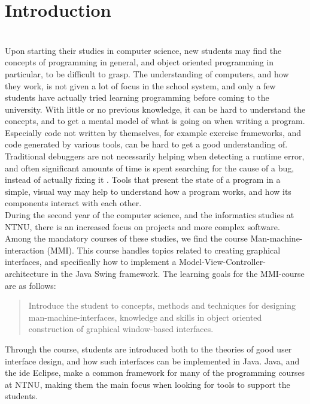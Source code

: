 \section{Introduction}\label{introduction}
~\\
Upon starting their studies in computer science, new students may find the concepts of programming in general, and object oriented programming in particular, to be difficult to grasp.
The understanding of computers, and how they work, is not given a lot of focus in the school system, and only a few students have actually tried learning programming before coming to the university.
With little or no previous knowledge, it can be hard to understand the concepts, and to get a mental model of what is going on when writing a program.
Especially code not written by themselves, for example exercise frameworks, and code generated by various tools, can be hard to get a good understanding of.
Traditional debuggers are not necessarily helping when detecting a runtime error, and often significant amounts of time is spent searching for the cause of a bug, instead of actually fixing it \cite{ko2006}.
Tools that present the state of a program in a simple, visual way may help to understand how a program works, and how its components interact with each other.
~\\

During the second year of the computer science, and the informatics studies at NTNU, there is an increased focus on projects and more complex software.
Among the mandatory courses of these studies, we find the course Man-machine-interaction (MMI).
This course handles topics related to creating graphical interfaces, and specifically how to implement a Model-View-Controller-architecture in the Java Swing framework.
The learning goals for the MMI-course are as follows:
\begin{quotation}
Introduce the student to concepts, methods and techniques for designing man-machine-interfaces, knowledge and skills in object oriented construction of graphical window-based interfaces.
\end{quotation}
Through the course, students are introduced both to the theories of good user interface design, and how such interfaces can be implemented in Java.
Java, and the \gls{ide} Eclipse, make a common framework for many of the programming courses at NTNU, making them the main focus when looking for tools to support the students.
~\\

